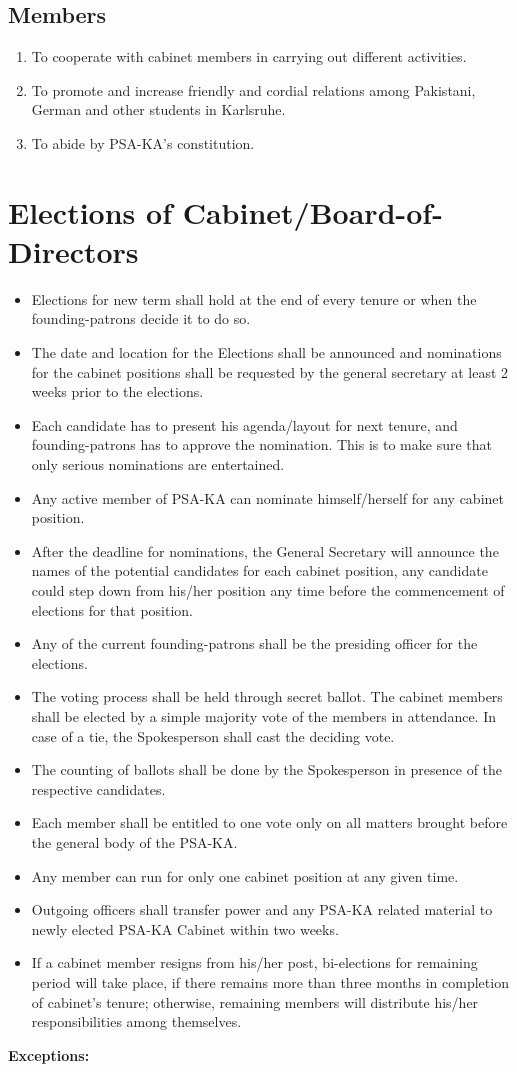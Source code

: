 \subsection{Members }
\begin{enumerate}
	\item To cooperate with cabinet members in carrying out different activities. 
	\item To promote and increase friendly and cordial relations among Pakistani, German and other students in Karlsruhe. 
	\item To abide by PSA-KA’s constitution. 
\end{enumerate}
\section{Elections of Cabinet/Board-of-Directors }
\begin{itemize}
	\item Elections for new term shall hold at the end of every tenure or when the founding-patrons decide it to do so. 
	\item The date and location for the Elections shall be announced and nominations for the cabinet positions shall be requested by the general secretary at least 2 weeks prior to the elections. 
	\item Each candidate has to present his agenda/layout for next tenure, and founding-patrons has to approve the nomination. This is to make sure that only serious nominations are entertained.
	\item Any active member of PSA-KA can nominate himself/herself for any cabinet position. 
	\item After the deadline for nominations, the General Secretary will announce the names of the potential candidates for each cabinet position, any candidate could step down from his/her position any time before the commencement of elections for that position. 
	\item Any of the current founding-patrons shall be the presiding officer for the elections. 
	\item The voting process shall be held through secret ballot. The cabinet members shall be elected by a simple majority vote of the members in attendance. In case of a tie, the Spokesperson shall cast the deciding vote. 
	\item The counting of ballots shall be done by the Spokesperson in presence of the respective candidates. 
	\item Each member shall be entitled to one vote only on all matters brought before the general body of the PSA-KA. 
	\item Any member can run for only one cabinet position at any given time. 
	\item Outgoing officers shall transfer power and any PSA-KA related material to newly elected PSA-KA Cabinet within two weeks. 
	\item If a cabinet member resigns from his/her post, bi-elections for remaining period will take place, if there remains more than three months in completion of cabinet’s tenure; otherwise, remaining members will distribute his/her responsibilities among themselves.  
\end{itemize}
\textbf{Exceptions: }

